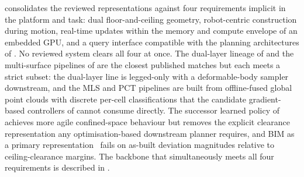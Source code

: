 \documentclass[11pt,a4paper]{article}
\begin{document}
 consolidates the reviewed representations against four requirements implicit in the platform and task: dual floor-and-ceiling geometry, robot-centric construction during motion, real-time updates within the memory and compute envelope of an embedded GPU, and a query interface compatible with the planning architectures of . No reviewed system clears all four at once. The dual-layer lineage of \citet{buchananWalkingPostureAdaptation2019,PerceptiveWholebodyPlanning} and the multi-surface pipelines of \citet{lodhiTraversability_generator3dLibrary3D2026,bockmannUgv_nav4dAdvancedMultiSurface2024,yangEfficientGlobalNavigational2024} are the closest published matches but each meets a strict subset: the dual-layer line is legged-only with a deformable-body sampler downstream, and the MLS and PCT pipelines are built from offline-fused global point clouds with discrete per-cell classifications that the candidate gradient-based controllers of  cannot consume directly. The successor learned policy of \citet{mikiLearningWalkConfined2024} achieves more agile confined-space behaviour but removes the explicit clearance representation any optimisation-based downstream planner requires, and BIM as a primary representation~\citep{kimDevelopmentBIMintegratedConstruction2021,hilti2020jaibot,blum2020} fails on as-built deviation magnitudes relative to ceiling-clearance margins. The backbone that simultaneously meets all four requirements is described in .
\end{document}
